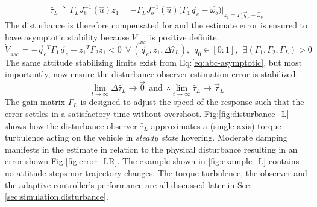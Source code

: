 \begin{equation}\label{eq:asymptotic-disturbance}
\dot{\hat{\tau}}_L\triangleq\Gamma_L J_b^{-1}(\hat{u})z_1=-\Gamma_L J_b^{-1}(\hat{u})\big(\Gamma_1\vec{q}_e-\hat{\omega_b}\big)\Big|_{z_1=\Gamma_1\vec{q}_e-\hat{\omega}_b}
\end{equation}
The disturbance is therefore compensated for and the estimate error is ensured to have asymptotic stability because $V_{_{ABC}}$ is positive definite.
\begin{equation}\label{eq:abc-asymptotic}
\dot{V}_{_{ABC}}=-\vec{q}_e\text{}^T\Gamma_1\vec{q}_e-z_1\text{}^T\Gamma_2z_1<0~~\forall~(\vec{q}_e,z_1,\Delta\hat{\tau}_L),~~q_0\in[0:1],~~\exists(\Gamma_1,\Gamma_2,\Gamma_L)>0
\end{equation}
The same attitude stabilizing limits exist from Eq:\ref{eq:abc-asymptotic}, but most importantly, now ensure the disturbance observer estimation error is stabilized:
\begin{subequations}
\begin{equation}
\underset{t\rightarrow\infty}{\lim}\Delta\hat{\tau}_L\rightarrow \vec{0}~~\text{and}~~
\therefore\underset{t\rightarrow\infty}{\lim}\hat{\tau}_L\rightarrow\vec{\tau}_L
\end{equation}
\end{subequations}
The gain matrix $\Gamma_L$ is designed to adjust the speed of the response such that the error settles in a satisfactory time without overshoot. Fig:\ref{fig:disturbance_L} shows how the disturbance observer $\hat{\tau}_L$ approximates a (single axis) torque turbulence acting on the vehicle in \emph{steady state} hovering. Moderate damping manifests in the estimate in relation to the physical disturbance resulting in an error shown Fig:\ref{fig:error_LR}. The example shown in \ref{fig:example_L} contains no attitude steps nor trajectory changes. The torque turbulence, the observer and the adaptive controller's performance are all discussed later in Sec:\ref{sec:simulation.disturbance}.
